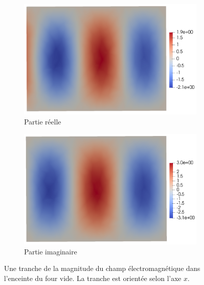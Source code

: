 \begin{figure}[H]
    \centering
    \begin{subfigure}{.5\textwidth}
        \centering
        \includegraphics[scale=0.15]{figures/helmholtz/helmholtz_reel_vide1.png}
        \caption{Partie réelle}
    \end{subfigure}%
    \begin{subfigure}{.5\textwidth}
        \centering
        \includegraphics[scale=0.15]{figures/helmholtz/helmholtz_imag_vide1.png}
        \caption{Partie imaginaire}
    \end{subfigure}
    \caption{Une tranche de la magnitude du champ électromagnétique dans l'enceinte
    du four vide. La tranche est orientée selon l'axe $x$.}
\end{figure}

